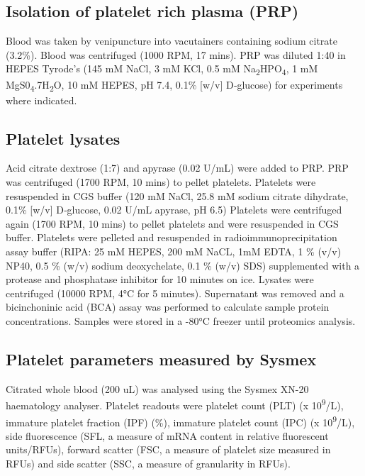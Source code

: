 \documentclass[11pt,twoside]{bristolthesis}
\begin{document}
\hypertarget{isolation-of-platelet-rich-plasma-prp}{%
\subsection{Isolation of platelet rich plasma (PRP)}\label{isolation-of-platelet-rich-plasma-prp}}

Blood was taken by venipuncture into vacutainers containing sodium citrate (3.2\%). Blood was centrifuged (1000 RPM, 17 mins). PRP was diluted 1:40 in HEPES Tyrode's (145 mM NaCl, 3 mM KCl, 0.5 mM Na\textsubscript{2}HPO\textsubscript{4}, 1 mM MgS0\textsubscript{4}.7H\textsubscript{2}O, 10 mM HEPES, pH 7.4, 0.1\% {[}w/v{]} D‐glucose) for experiments where indicated.

\hypertarget{platelet-lysates}{%
\subsection{Platelet lysates}\label{platelet-lysates}}

Acid citrate dextrose (1:7) and apyrase (0.02 U/mL) were added to PRP. PRP was centrifuged (1700 RPM, 10 mins) to pellet platelets. Platelets were resuspended in CGS buffer (120 mM NaCl, 25.8 mM sodium citrate dihydrate, 0.1\% {[}w/v{]} D‐glucose, 0.02 U/mL apyrase, pH 6.5) Platelets were centrifuged again (1700 RPM, 10 mins) to pellet platelets and were resuspended in CGS buffer. Platelets were pelleted and resuspended in radioimmunoprecipitation assay buffer (RIPA: 25 mM HEPES, 200 mM NaCL, 1mM EDTA, 1 \% (v/v) NP40, 0.5 \% (w/v) sodium deoxychelate, 0.1 \% (w/v) SDS) supplemented with a protease and phosphatase inhibitor for 10 minutes on ice. Lysates were centrifuged (10000 RPM, 4°C for 5 minutes). Supernatant was removed and a bicinchoninic acid (BCA) assay was performed to calculate sample protein concentrations. Samples were stored in a -80°C freezer until proteomics analysis.

\hypertarget{platelet-parameters-measured-by-sysmex}{%
\subsection{Platelet parameters measured by Sysmex}\label{platelet-parameters-measured-by-sysmex}}

Citrated whole blood (200 uL) was analysed using the Sysmex XN-20 haematology analyser. Platelet readouts were platelet count (PLT) (x 10\textsuperscript{9}/L), immature platelet fraction (IPF) (\%), immature platelet count (IPC) (x 10\textsuperscript{9}/L), side fluorescence (SFL, a measure of mRNA content in relative fluorescent units/RFUs), forward scatter (FSC, a measure of platelet size measured in RFUs) and side scatter (SSC, a measure of granularity in RFUs).
\end{document}
